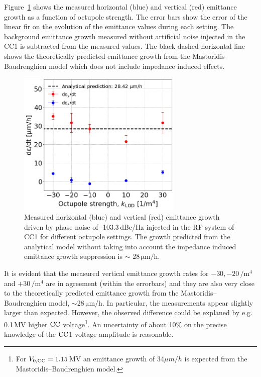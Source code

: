 Figure~\ref{fig:H_V_emit_growth_background_subtracted_octupole_scan_sep22} shows the measured horizontal (blue) and vertical (red) emittance growth as a function of octupole strength. The error bars show the error of the linear fir on the evolution of the emittance values during each setting. The background emittance growth measured without artificial noise injected in the CC1 is subtracted from the measured values. The black dashed horizontal line shows the theoretically predicted emittance growth from the Mastoridis--Baudrenghien model which does not include impedance induced effects.

\begin{figure}[!h]
   \centering         
   \includegraphics[width=0.7\textwidth]{images/Ch8/summary_md_12sep22_x_vs_y_backg_subtracted.png}
       \caption{Measured horizontal (blue) and vertical (red) emittance growth driven by phase noise of -103.3\,dBc/Hz injected in the RF system of CC1 for different octupole settings. The growth predicted from the analytical model without taking into account the impedance induced emittance growth suppression is $\sim$ 28\,$\mathrm{\mu m/h}$.}
       \label{fig:H_V_emit_growth_background_subtracted_octupole_scan_sep22}
\end{figure}

It is evident that the measured vertical emittance growth rates for $-30, -20$\,$\mathrm{/m^4}$ and $+30$\,$\mathrm{/m^4}$ are in agreement (within the errorbars) and they are also very close to the theoretically predicted emittance growth from the Mastoridis--Baudrenghien model, $\sim$28\,$\mathrm{\mu m /h}$. In particular, the measurements appear slightly larger than expected. However, the observed difference could be explaned by e.g. 0.1\,MV higher ${\mathrm{CC}}$ voltage\footnote{For ${V_\mathrm{0, CC}}=1.15$\,MV an emittance growth of 34$\mu m/h$ is expected from the Mastoridis--Baudrenghien model.}. An uncertainty of about 10$\%$ on the precise knowledge of the ${\mathrm{CC}}$1 voltage amplitude is reasonable.

